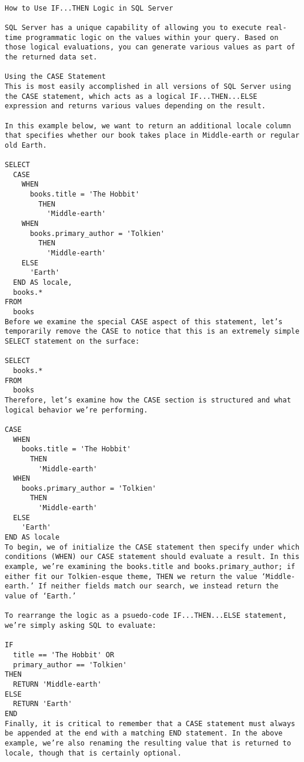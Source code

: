 \begin{lstlisting}[frame=single]

How to Use IF...THEN Logic in SQL Server

SQL Server has a unique capability of allowing you to execute real-time programmatic logic on the values within your query. Based on those logical evaluations, you can generate various values as part of the returned data set.

Using the CASE Statement
This is most easily accomplished in all versions of SQL Server using the CASE statement, which acts as a logical IF...THEN...ELSE expression and returns various values depending on the result.

In this example below, we want to return an additional locale column that specifies whether our book takes place in Middle-earth or regular old Earth.

SELECT
  CASE
    WHEN
      books.title = 'The Hobbit'
        THEN
          'Middle-earth'
    WHEN
      books.primary_author = 'Tolkien'
        THEN
          'Middle-earth'
    ELSE
      'Earth'
  END AS locale,
  books.*
FROM
  books
Before we examine the special CASE aspect of this statement, let’s temporarily remove the CASE to notice that this is an extremely simple SELECT statement on the surface:

SELECT
  books.*
FROM
  books
Therefore, let’s examine how the CASE section is structured and what logical behavior we’re performing.

CASE
  WHEN
    books.title = 'The Hobbit'
      THEN
        'Middle-earth'
  WHEN
    books.primary_author = 'Tolkien'
      THEN
        'Middle-earth'
  ELSE
    'Earth'
END AS locale
To begin, we of initialize the CASE statement then specify under which conditions (WHEN) our CASE statement should evaluate a result. In this example, we’re examining the books.title and books.primary_author; if either fit our Tolkien-esque theme, THEN we return the value ‘Middle-earth.’ If neither fields match our search, we instead return the value of ‘Earth.’

To rearrange the logic as a psuedo-code IF...THEN...ELSE statement, we’re simply asking SQL to evaluate:

IF
  title == 'The Hobbit' OR
  primary_author == 'Tolkien'
THEN
  RETURN 'Middle-earth'
ELSE
  RETURN 'Earth'
END
Finally, it is critical to remember that a CASE statement must always be appended at the end with a matching END statement. In the above example, we’re also renaming the resulting value that is returned to locale, though that is certainly optional.


\end{lstlisting}
